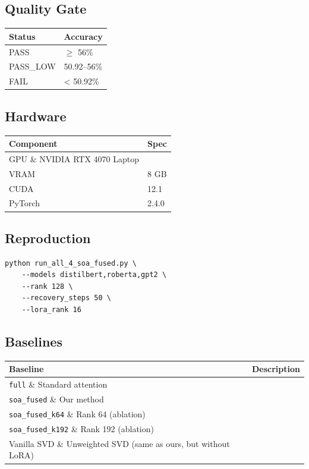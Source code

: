 \subsection{Quality Gate}

\begin{table}[H]
\centering
\small
\begin{tabular}{ll}
\toprule
\textbf{Status} & \textbf{Accuracy} \\
\midrule
PASS & $\ge$ 56\% \\
PASS\_LOW & 50.92--56\% \\
FAIL & < 50.92\% \\
\bottomrule
\end{tabular}
\end{table}

\subsection{Hardware}

\begin{table}[H]
\centering
\small
\begin{tabular}{ll}
\toprule
\textbf{Component} & \textbf{Spec} \\
\midrule
GPU \& NVIDIA RTX 4070 Laptop \\
VRAM & 8 GB \\
CUDA & 12.1 \\
PyTorch & 2.4.0 \\
\bottomrule
\end{tabular}
\end{table}

\subsection{Reproduction}

\begin{lstlisting}
python run_all_4_soa_fused.py \
    --models distilbert,roberta,gpt2 \
    --rank 128 \
    --recovery_steps 50 \
    --lora_rank 16
\end{lstlisting}

\subsection{Baselines}

\begin{table}[H]
\centering
\small
\begin{tabular}{ll}
\toprule
\textbf{Baseline} & \textbf{Description} \\
\midrule
\texttt{full} \& Standard attention \\
\texttt{soa\_fused} \& Our method \\
\texttt{soa\_fused\_k64} \& Rank 64 (ablation) \\
\texttt{soa\_fused\_k192} \& Rank 192 (ablation) \\
Vanilla SVD \& Unweighted SVD (same as ours, but without LoRA) \\
\bottomrule
\end{tabular}
\end{table}

